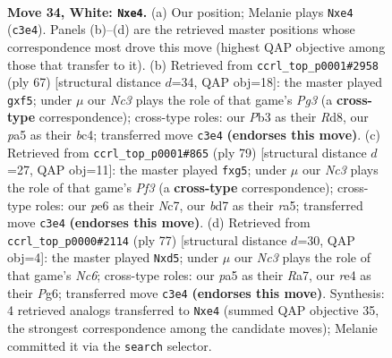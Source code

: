 \documentclass[11pt]{article}
\begin{document}
\clearpage

\begin{figure}[p]\centering
\begin{subfigure}{0.46\textwidth}\centering
\resizebox{\linewidth}{!}{%
\newchessgame
\chessboard[
  setfen={7r/3bk3/1p2p3/p7/P3r3/1PN3P1/5K2/R7 w - - 0 34},
  showmover=false,
  pgfstyle=straightmove, color=movearrow, markmove={c3-e4}
]}
\caption{}
\end{subfigure}\hfill
\begin{subfigure}{0.46\textwidth}\centering
\resizebox{\linewidth}{!}{%
\newchessgame
\chessboard[
  setfen={3r4/8/6pk/5R1p/1pB2n2/5P2/1P4PP/2R4K b - - 0 34},
  showmover=false,
  pgfstyle=straightmove, color=movearrow, markmove={g6-f5}
]}
\caption{}
\end{subfigure}
\\[4pt]
\begin{subfigure}{0.46\textwidth}\centering
\resizebox{\linewidth}{!}{%
\newchessgame
\chessboard[
  setfen={8/2n1k2p/p2r1p2/R4PP1/8/6P1/6K1/5B2 b - - 0 40},
  showmover=false,
  pgfstyle=straightmove, color=movearrow, markmove={f6-g5}
]}
\caption{}
\end{subfigure}\hfill
\begin{subfigure}{0.46\textwidth}\centering
\resizebox{\linewidth}{!}{%
\newchessgame
\chessboard[
  setfen={6k1/r6p/6p1/3B1p2/1P1R4/2n2P2/5KPP/8 b - - 0 39},
  showmover=false,
  pgfstyle=straightmove, color=movearrow, markmove={c3-d5}
]}
\caption{}
\end{subfigure}
\caption{\textbf{Move 34, White: \texttt{Nxe4}.} (a) Our position; Melanie plays \texttt{Nxe4} (\texttt{c3e4}). Panels (b)--(d) are the retrieved master positions whose correspondence most drove this move (highest QAP objective among those that transfer to it). (b) Retrieved from \texttt{ccrl\_top\_p0001\#2958} (ply 67) [structural distance $d$=34, QAP obj=18]: the master played \texttt{gxf5}; under $\mu$ our \emph{Nc3} plays the role of that game's \emph{Pg3} (a \textbf{cross-type} correspondence); cross-type roles: our \emph{P}b3 as their \emph{R}d8, our \emph{p}a5 as their \emph{b}c4; transferred move \texttt{c3e4} \textbf{(endorses this move)}. (c) Retrieved from \texttt{ccrl\_top\_p0001\#865} (ply 79) [structural distance $d$=27, QAP obj=11]: the master played \texttt{fxg5}; under $\mu$ our \emph{Nc3} plays the role of that game's \emph{Pf3} (a \textbf{cross-type} correspondence); cross-type roles: our \emph{p}e6 as their \emph{N}c7, our \emph{b}d7 as their \emph{r}a5; transferred move \texttt{c3e4} \textbf{(endorses this move)}. (d) Retrieved from \texttt{ccrl\_top\_p0000\#2114} (ply 77) [structural distance $d$=30, QAP obj=4]: the master played \texttt{Nxd5}; under $\mu$ our \emph{Nc3} plays the role of that game's \emph{Nc6}; cross-type roles: our \emph{p}a5 as their \emph{R}a7, our \emph{r}e4 as their \emph{P}g6; transferred move \texttt{c3e4} \textbf{(endorses this move)}. Synthesis: 4 retrieved analogs transferred to \texttt{Nxe4} (summed QAP objective 35, the strongest correspondence among the candidate moves); Melanie committed it via the \texttt{search} selector.}
\label{fig:thought-m66}
\end{figure}
\end{document}
